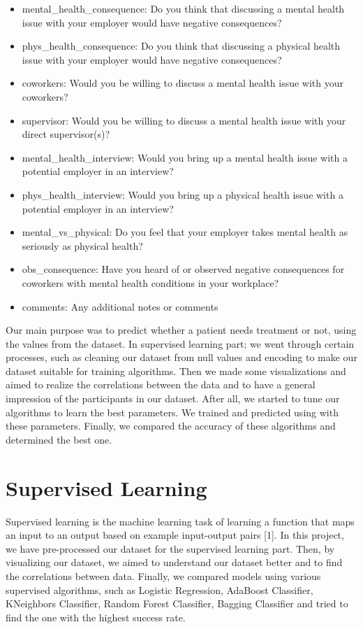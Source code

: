 \documentclass[onecolumn]{article}
\begin{document}
\begin{itemize}
\item mental\_health\_consequence: Do you think that discussing a mental health issue with your employer would have negative consequences?
\item phys\_health\_consequence: Do you think that discussing a physical health issue with your employer would have negative consequences?
\item coworkers: Would you be willing to discuss a mental health issue with your coworkers?
\item supervisor: Would you be willing to discuss a mental health issue with your direct supervisor(s)?
\item mental\_health\_interview: Would you bring up a mental health issue with a potential employer in an interview?
\item phys\_health\_interview: Would you bring up a physical health issue with a potential employer in an interview?
\item mental\_vs\_physical: Do you feel that your employer takes mental health as seriously as physical health?
\item obs\_consequence: Have you heard of or observed negative consequences for coworkers with mental health conditions in your workplace?
\item comments: Any additional notes or comments
\end{itemize}

Our main purpose was to predict whether a patient needs treatment or not, using the values from the dataset. In supervised learning part; we went through certain processes, such as cleaning our dataset from null values and encoding to make our dataset suitable for training algorithms. Then we made some visualizations and aimed to realize the correlations between the data and to have a general impression of the participants in our dataset. After all, we started to tune our algorithms to learn the best parameters. We trained and predicted using with these parameters. Finally, we compared the accuracy of these algorithms and determined the best one.


\section{Supervised Learning}
Supervised learning is the machine learning task of learning a function that maps an input to an output based on example input-output pairs [1]. In this project, we have pre-processed our dataset for the supervised learning part. Then, by visualizing our dataset, we aimed to understand our dataset better and to find the correlations between data. Finally, we compared models using various supervised algorithms, such as Logistic Regression, AdaBoost Classifier, KNeighbors Classifier, Random Forest Classifier, Bagging Classifier and tried to find the one with the highest success rate.
\end{document}
